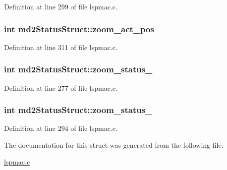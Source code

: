 Definition at line 299 of file lspmac.\-c.

\hypertarget{structmd2StatusStruct_a920b80e9f5f08aedac3ad541d5ffc8ae}{
\subsubsection[{zoom\-\_\-act\-\_\-pos}]{\setlength{\rightskip}{0pt plus 5cm}int md2\-Status\-Struct\-::zoom\-\_\-act\-\_\-pos}}\label{structmd2StatusStruct_a920b80e9f5f08aedac3ad541d5ffc8ae}


Definition at line 311 of file lspmac.\-c.

\hypertarget{structmd2StatusStruct_af28e978b761dc07eefed3971547cfd4d}{
\subsubsection[{zoom\-\_\-status\-\_\-1}]{\setlength{\rightskip}{0pt plus 5cm}int md2\-Status\-Struct\-::zoom\-\_\-status\-\_}}\label{structmd2StatusStruct_af28e978b761dc07eefed3971547cfd4d}


Definition at line 277 of file lspmac.\-c.

\hypertarget{structmd2StatusStruct_a34e4200315a083deb8a970e21bbbe277}{
\subsubsection[{zoom\-\_\-status\-\_\-2}]{\setlength{\rightskip}{0pt plus 5cm}int md2\-Status\-Struct\-::zoom\-\_\-status\-\_}}\label{structmd2StatusStruct_a34e4200315a083deb8a970e21bbbe277}


Definition at line 294 of file lspmac.\-c.



The documentation for this struct was generated from the following file\-:\begin{DoxyCompactItemize}
\item 
\hyperlink{lspmac_8c}{lspmac.\-c}\end{DoxyCompactItemize}
